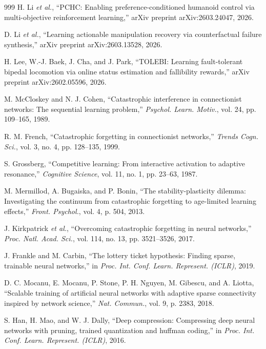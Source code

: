 \documentclass[12pt,a4paper,oneside]{report}
\begin{document}
\begin{thebibliography}{999}
H. Li \textit{et al.}, ``{PCHC}: Enabling preference-conditioned humanoid control via multi-objective reinforcement learning,'' arXiv preprint arXiv:2603.24047, 2026.

D. Li \textit{et al.}, ``Learning actionable manipulation recovery via counterfactual failure synthesis,'' arXiv preprint arXiv:2603.13528, 2026.

H. Lee, W.-J. Baek, J. Cha, and J. Park, ``{TOLEBI}: Learning fault-tolerant bipedal locomotion via online status estimation and fallibility rewards,'' arXiv preprint arXiv:2602.05596, 2026.

M. McCloskey and N. J. Cohen, ``Catastrophic interference in connectionist networks: The sequential learning problem,'' \textit{Psychol. Learn. Motiv.}, vol. 24, pp. 109--165, 1989.

R. M. French, ``Catastrophic forgetting in connectionist networks,'' \textit{Trends Cogn. Sci.}, vol. 3, no. 4, pp. 128--135, 1999.

S. Grossberg, ``Competitive learning: From interactive activation to adaptive resonance,'' \textit{Cognitive Science}, vol. 11, no. 1, pp. 23--63, 1987.

M. Mermillod, A. Bugaiska, and P. Bonin, ``The stability-plasticity dilemma: Investigating the continuum from catastrophic forgetting to age-limited learning effects,'' \textit{Front. Psychol.}, vol. 4, p. 504, 2013.

J. Kirkpatrick \textit{et al.}, ``Overcoming catastrophic forgetting in neural networks,'' \textit{Proc. Natl. Acad. Sci.}, vol. 114, no. 13, pp. 3521--3526, 2017.

J. Frankle and M. Carbin, ``The lottery ticket hypothesis: Finding sparse, trainable neural networks,'' in \textit{Proc. Int. Conf. Learn. Represent. (ICLR)}, 2019.

D. C. Mocanu, E. Mocanu, P. Stone, P. H. Nguyen, M. Gibescu, and A. Liotta, ``Scalable training of artificial neural networks with adaptive sparse connectivity inspired by network science,'' \textit{Nat. Commun.}, vol. 9, p. 2383, 2018.

S. Han, H. Mao, and W. J. Dally, ``Deep compression: Compressing deep neural networks with pruning, trained quantization and huffman coding,'' in \textit{Proc. Int. Conf. Learn. Represent. (ICLR)}, 2016.


\end{thebibliography}
\end{document}
